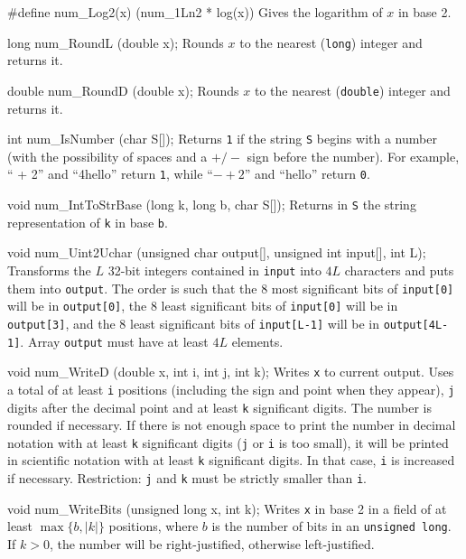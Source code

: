 #define num_Log2(x) (num_1Ln2 * log(x))
\endcode
  \tab Gives the logarithm of $x$ in base 2.
  \endtab
\code


long num_RoundL (double x);
\endcode
  \tab Rounds $x$ to the nearest ({\tt long}) integer and returns it.
  \endtab
\code


double num_RoundD (double x);
\endcode
  \tab Rounds $x$ to the nearest ({\tt double}) integer and returns it.
  \endtab
\code


int num_IsNumber (char S[]);
\endcode
\tab  Returns {\tt 1} if the string {\tt S} begins with a number
   (with the possibility of spaces and a $+/-$ sign
   before the number). For example, `` + 2'' and ``4hello''
   return {\tt 1}, while ``$-+2$'' and ``hello'' return
   {\tt 0}.
\endtab
\code


void num_IntToStrBase (long k, long b, char S[]);
\endcode
  \tab Returns in {\tt S} the string representation of {\tt k} in base
  {\tt b}.
  \endtab
\code


void num_Uint2Uchar (unsigned char output[], unsigned int input[], int L);
\endcode
  \tab Transforms the $L$ 32-bit integers contained in {\tt input} into
   $4L$ characters and puts them into {\tt output}. The order is such that
  the 8 most significant bits of {\tt input[0]} will be in {\tt output[0]},
  the 8 least significant bits of {\tt input[0]} will be in {\tt output[3]},
  and the 8 least significant bits of {\tt input[L-1]} will be in
   {\tt output[4L-1]}. Array {\tt output} must have at least $4L$ elements.
  \endtab
\code


void num_WriteD (double x, int i, int j, int k);
\endcode
  \tab  Writes {\tt x} to current output.  Uses a total of at least {\tt i}
   positions (including the sign and point when they appear),
   {\tt j} digits after the decimal point and at least {\tt k}
   significant digits.   The number is rounded if necessary.
   If there is not enough space to print the number in decimal notation
   with at least {\tt k} significant digits
   ({\tt j} or {\tt i} is too small), it will be printed in scientific
   notation with at least {\tt k} significant digits.
   In that case, {\tt i} is increased if necessary.
   Restriction: {\tt j} and {\tt k} must be strictly smaller than {\tt i}.
 \endtab
\code


void num_WriteBits (unsigned long x, int k);
\endcode
 \tab Writes {\tt x} in base 2 in a field of at least
  $\max\{b, |k|\}$ positions, where $b$ is the number of bits in an
  {\tt unsigned long}.
  If $k>0$, the number will be right-justified, otherwise left-justified.
 \endtab
\code


